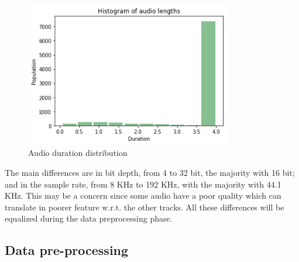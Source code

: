 \documentclass{article}
\begin{document}
\begin{figure}[H]
	\centering
	\includegraphics[width=0.8\textwidth]{./images/mono/duration.png}	
	\caption{Audio duration distribution}
	\label{fig:mono_duration}
\end{figure}

The main differences are in bit depth, from 4 to 32 bit, the majority with 16 bit; and in the sample rate, from 8 KHz to 192 KHz, with the majority with 44.1 KHz. This may be a concern since some audio have a poor quality which can translate in poorer feature w.r.t. the other tracks. All these differences will be equalized during the data preprocessing phase.

\subsection{Data pre-processing}
\label{subsec:mono_feature}
\end{document}
